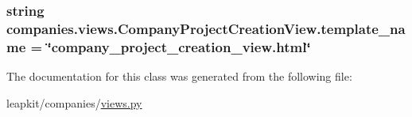 \hypertarget{classcompanies_1_1views_1_1_company_project_creation_view_ab3bcfcae7ebc6a57a02e9219d032f710}{
\subsubsection[{template\-\_\-name}]{\setlength{\rightskip}{0pt plus 5cm}string companies.\-views.\-Company\-Project\-Creation\-View.\-template\-\_\-name = \char`\"{}company\-\_\-project\-\_\-creation\-\_\-view.\-html\char`\"{}\hspace{0.3cm}{\ttfamily [static]}}}\label{classcompanies_1_1views_1_1_company_project_creation_view_ab3bcfcae7ebc6a57a02e9219d032f710}


The documentation for this class was generated from the following file\-:\begin{DoxyCompactItemize}
\item 
leapkit/companies/\hyperlink{companies_2views_8py}{views.\-py}\end{DoxyCompactItemize}
